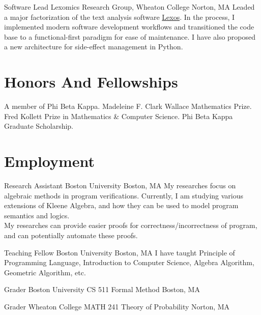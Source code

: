 \documentclass[11pt,roman]{moderncv}        %
\begin{document}
{Software Lead}
{Lexomics Research Group, Wheaton College}
{Norton, MA}{}
{
  Leaded a major factorization of the text analysis software 
  \href{https://github.com/WheatonCS/Lexos}{Lexos}.
  In the process, I implemented modern software development workflows and
  transitioned the code base to a functional-first paradigm for ease of maintenance.
  I have also proposed a new architecture for side-effect management in Python.
}


\section{Honors And Fellowships}
 {A member of Phi Beta Kappa.}
 {
  Madeleine F. Clark Wallace Mathematics Prize. \newline
  Fred Kollett Prize in Mathematics \& Computer Science. \newline
  Phi Beta Kappa Graduate Scholarship.
}


\section{Employment}

{Research Assistant}
{Boston University}
{Boston, MA}{}
{My researches focus on algebraic methods in program verifications.
Currently, I am studying various extensions of Kleene Algebra, 
and how they can be used to model program semantics and logics.\\
My researches can provide easier proofs for correctness/incorrectness of program,
and can potentially automate these proofs.
}

{Teaching Fellow}
{Boston University}
{Boston, MA}{}
{
  I have taught Principle of Programming Language, Introduction to Computer Science,
  Algebra Algorithm, Geometric Algorithm, etc.
}

{Grader}
{Boston University CS 511 Formal Method}
{Boston, MA}{}{}

{Grader}
{Wheaton College MATH 241 Theory of Probability}
{Norton, MA}{}{}
\end{document}
